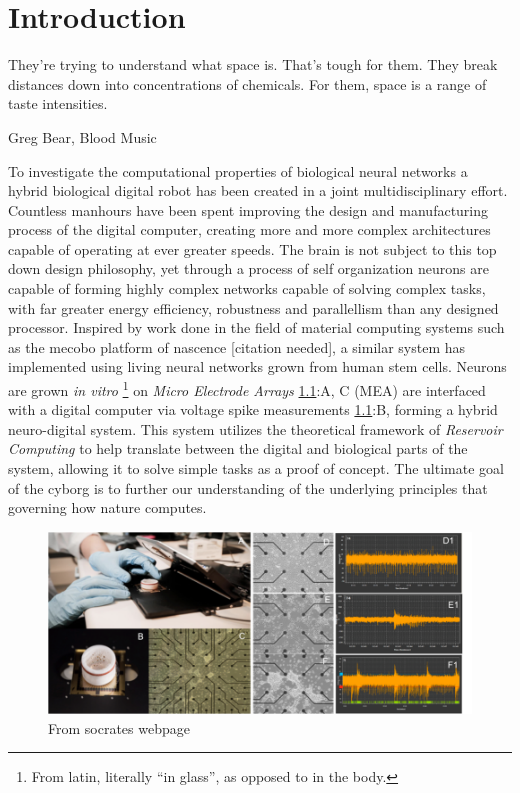 \chapter{Introduction}
\epigraph{They're trying to understand what space is. That's tough for them.
They break distances down into concentrations of chemicals. For them, space is a
range of taste intensities.}{Greg Bear, Blood Music}
To investigate the computational properties of biological neural networks a
hybrid biological digital robot has been created in a joint multidisciplinary
effort. 
Countless manhours have been spent improving the design and manufacturing
process of the digital computer, creating more and more complex architectures
capable of operating at ever greater speeds.
%
The brain is not subject to this top down design philosophy, yet through a
process of self organization neurons are capable of forming highly complex
networks capable of solving complex tasks, with far greater energy efficiency,
robustness and parallellism than any designed processor.
%
Inspired by work done in the field of material computing systems such as the
mecobo platform of nascence [citation needed], a similar system has implemented
using living neural networks grown from human stem cells.
Neurons are grown \emph{in vitro} \footnote{From latin, literally ``in glass'',
as opposed to in the body.} on \emph{Micro Electrode Arrays} \ref{neuroIntro}:A,
C (MEA) are interfaced with a digital computer via voltage spike measurements
\ref{neuroIntro}:B, forming a hybrid neuro-digital system.
%
This system utilizes the theoretical framework of \emph{Reservoir Computing} to
help translate between the digital and biological parts of the system, allowing
it to solve simple tasks as a proof of concept.
%
The ultimate goal of the cyborg is to further our understanding of the
underlying principles that governing how nature computes.
\begin{figure}[h!]
  \centering
  \includegraphics[width=1\textwidth]{fig/MEA_overview.png}
  \caption{From socrates webpage}
  \label{neuroIntro}
\end{figure}
